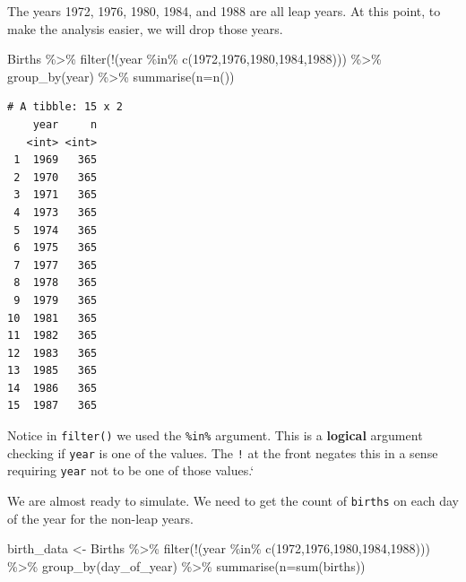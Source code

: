 \documentclass[
  letterpaper,
  DIV=11,
  numbers=noendperiod]{scrreprt}
\newenvironment{Shaded}{\begin{snugshade}}{\end{snugshade}}
\newcommand{\AttributeTok}[1]{\textcolor[rgb]{0.40,0.45,0.13}{#1}}
\newcommand{\DecValTok}[1]{\textcolor[rgb]{0.68,0.00,0.00}{#1}}
\newcommand{\FunctionTok}[1]{\textcolor[rgb]{0.28,0.35,0.67}{#1}}
\newcommand{\NormalTok}[1]{\textcolor[rgb]{0.00,0.23,0.31}{#1}}
\newcommand{\OtherTok}[1]{\textcolor[rgb]{0.00,0.23,0.31}{#1}}
\newcommand{\SpecialCharTok}[1]{\textcolor[rgb]{0.37,0.37,0.37}{#1}}
\begin{document}
The years 1972, 1976, 1980, 1984, and 1988 are all leap years. At this
point, to make the analysis easier, we will drop those years.

\begin{Shaded}
\begin{Highlighting}[]
\NormalTok{Births }\SpecialCharTok{\%\textgreater{}\%}
  \FunctionTok{filter}\NormalTok{(}\SpecialCharTok{!}\NormalTok{(year }\SpecialCharTok{\%in\%} \FunctionTok{c}\NormalTok{(}\DecValTok{1972}\NormalTok{,}\DecValTok{1976}\NormalTok{,}\DecValTok{1980}\NormalTok{,}\DecValTok{1984}\NormalTok{,}\DecValTok{1988}\NormalTok{))) }\SpecialCharTok{\%\textgreater{}\%}
  \FunctionTok{group\_by}\NormalTok{(year) }\SpecialCharTok{\%\textgreater{}\%}
  \FunctionTok{summarise}\NormalTok{(}\AttributeTok{n=}\FunctionTok{n}\NormalTok{())}
\end{Highlighting}
\end{Shaded}

\begin{verbatim}
# A tibble: 15 x 2
    year     n
   <int> <int>
 1  1969   365
 2  1970   365
 3  1971   365
 4  1973   365
 5  1974   365
 6  1975   365
 7  1977   365
 8  1978   365
 9  1979   365
10  1981   365
11  1982   365
12  1983   365
13  1985   365
14  1986   365
15  1987   365
\end{verbatim}

Notice in \texttt{filter()} we used the \texttt{\%in\%} argument. This
is a \textbf{logical} argument checking if \texttt{year} is one of the
values. The \texttt{!} at the front negates this in a sense requiring
\texttt{year} not to be one of those values.`

We are almost ready to simulate. We need to get the count of
\texttt{births} on each day of the year for the non-leap years.

\begin{Shaded}
\begin{Highlighting}[]
\NormalTok{birth\_data }\OtherTok{\textless{}{-}}\NormalTok{ Births }\SpecialCharTok{\%\textgreater{}\%}
  \FunctionTok{filter}\NormalTok{(}\SpecialCharTok{!}\NormalTok{(year }\SpecialCharTok{\%in\%} \FunctionTok{c}\NormalTok{(}\DecValTok{1972}\NormalTok{,}\DecValTok{1976}\NormalTok{,}\DecValTok{1980}\NormalTok{,}\DecValTok{1984}\NormalTok{,}\DecValTok{1988}\NormalTok{))) }\SpecialCharTok{\%\textgreater{}\%}
  \FunctionTok{group\_by}\NormalTok{(day\_of\_year) }\SpecialCharTok{\%\textgreater{}\%}
  \FunctionTok{summarise}\NormalTok{(}\AttributeTok{n=}\FunctionTok{sum}\NormalTok{(births)) }
\end{Highlighting}
\end{Shaded}
\end{document}
